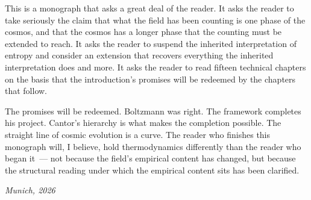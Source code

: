 \medskip

This is a monograph that asks a great deal of the reader. It asks the reader to take
seriously the claim that what the field has been counting is one phase of the cosmos,
and that the cosmos has a longer phase that the counting must be extended to reach.
It asks the reader to suspend the inherited interpretation of entropy and consider an
extension that recovers everything the inherited interpretation does and more. It asks
the reader to read fifteen technical chapters on the basis that the introduction's
promises will be redeemed by the chapters that follow.

The promises will be redeemed. Boltzmann was right. The framework completes his
project. Cantor's hierarchy is what makes the completion possible. The straight line
of cosmic evolution is a curve. The reader who finishes this monograph will, I believe,
hold thermodynamics differently than the reader who began it~--- not because the
field's empirical content has changed, but because the structural reading under which
the empirical content sits has been clarified.

\bigskip

\noindent\textit{Munich, 2026}
